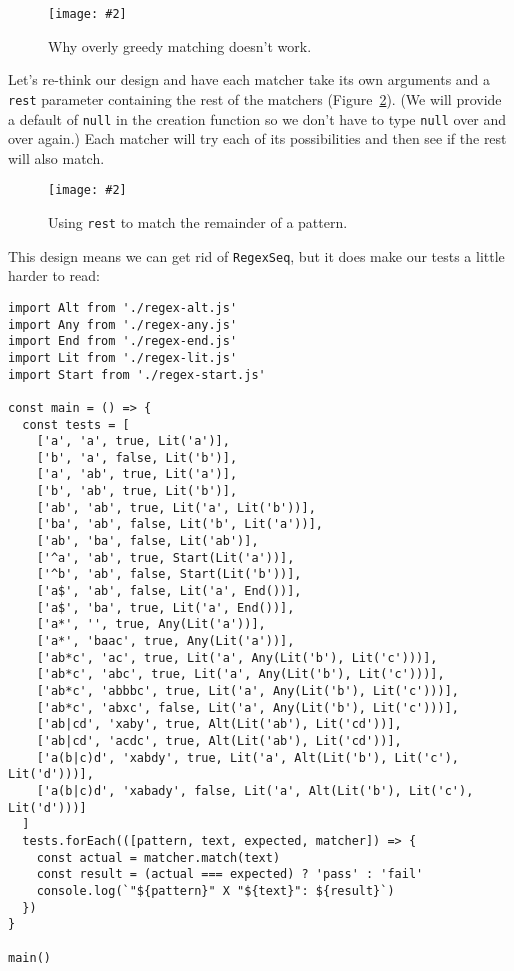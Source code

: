 \documentclass[krantzl]{krantz}
\newcommand{\figpdf}[4]{\begin{figure}%
\centering%
\texttt{[image: \#2]}%
\caption{#3}%
\label{#1}%
\end{figure}}
\newcommand{\figref}[1]{Figure~\ref{#1}}
\begin{document}
\figpdf{pattern-matching-greedy-failure}{./pattern-matching/greedy-failure.pdf}{Why overly greedy matching doesn’t work.}{0.6}


Let’s re-think our design
and have each matcher take its own arguments and a \texttt{rest} parameter containing the rest of the matchers
(\figref{pattern-matching-rest}).
(We will provide a default of \texttt{null} in the creation function
so we don’t have to type \texttt{null} over and over again.)
Each matcher will try each of its possibilities and then see if the rest will also match.

\figpdf{pattern-matching-rest}{./pattern-matching/rest.pdf}{Using \texttt{rest} to match the remainder of a pattern.}{0.6}


This design means we can get rid of \texttt{RegexSeq},
but it does make our tests a little harder to read:


\begin{lstlisting}[frame=tblr]
import Alt from './regex-alt.js'
import Any from './regex-any.js'
import End from './regex-end.js'
import Lit from './regex-lit.js'
import Start from './regex-start.js'

const main = () => {
  const tests = [
    ['a', 'a', true, Lit('a')],
    ['b', 'a', false, Lit('b')],
    ['a', 'ab', true, Lit('a')],
    ['b', 'ab', true, Lit('b')],
    ['ab', 'ab', true, Lit('a', Lit('b'))],
    ['ba', 'ab', false, Lit('b', Lit('a'))],
    ['ab', 'ba', false, Lit('ab')],
    ['^a', 'ab', true, Start(Lit('a'))],
    ['^b', 'ab', false, Start(Lit('b'))],
    ['a$', 'ab', false, Lit('a', End())],
    ['a$', 'ba', true, Lit('a', End())],
    ['a*', '', true, Any(Lit('a'))],
    ['a*', 'baac', true, Any(Lit('a'))],
    ['ab*c', 'ac', true, Lit('a', Any(Lit('b'), Lit('c')))],
    ['ab*c', 'abc', true, Lit('a', Any(Lit('b'), Lit('c')))],
    ['ab*c', 'abbbc', true, Lit('a', Any(Lit('b'), Lit('c')))],
    ['ab*c', 'abxc', false, Lit('a', Any(Lit('b'), Lit('c')))],
    ['ab|cd', 'xaby', true, Alt(Lit('ab'), Lit('cd'))],
    ['ab|cd', 'acdc', true, Alt(Lit('ab'), Lit('cd'))],
    ['a(b|c)d', 'xabdy', true, Lit('a', Alt(Lit('b'), Lit('c'), Lit('d')))],
    ['a(b|c)d', 'xabady', false, Lit('a', Alt(Lit('b'), Lit('c'), Lit('d')))]
  ]
  tests.forEach(([pattern, text, expected, matcher]) => {
    const actual = matcher.match(text)
    const result = (actual === expected) ? 'pass' : 'fail'
    console.log(`"${pattern}" X "${text}": ${result}`)
  })
}

main()
\end{lstlisting}
\end{document}
